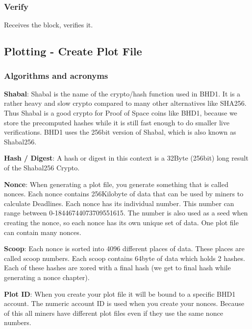 \subsubsection{Verify}
\begin{flushleft}
    Receives the block, verifies it.
\end{flushleft}
\subsection{Plotting - Create Plot File}
\subsubsection{Algorithms and acronyms}
\begin{flushleft}
    \textbf{Shabal}: Shabal is the name of the crypto/hash function used in BHD1. It is a rather heavy and slow crypto compared to many other alternatives like SHA256. Thus Shabal is a good crypto for Proof of Space coins like BHD1, because we store the precomputed hashes while it is still fast enough to do smaller live verifications. BHD1 uses the 256bit version of Shabal, which is also known as Shabal256.
\end{flushleft}
\begin{flushleft}
    \textbf{Hash / Digest}: A hash or digest in this context is a 32Byte (256bit) long result of the Shabal256 Crypto.
\end{flushleft}
\begin{flushleft}
    \textbf{Nonce}: When generating a plot file, you generate something that is called nonces. Each nonce contains 256Kilobyte of data that can be used by miners to calculate Deadlines. Each nonce has its individual number. This number can range between 0-18446744073709551615. The number is also used as a seed when creating the nonce, so each nonce has its own unique set of data. One plot file can contain many nonces.
\end{flushleft}
\begin{flushleft}
    \textbf{Scoop}: Each nonce is sorted into 4096 different places of data. These places are called scoop numbers. Each scoop contains 64byte of data which holds 2 hashes. Each of these hashes are xored with a final hash (we get to final hash while generating a nonce chapter).
\end{flushleft}
\begin{flushleft}
    \textbf{Plot ID}: When you create your plot file it will be bound to a specific BHD1 account. The numeric account ID is used when you create your nonces. Because of this all miners have different plot files even if they use the same nonce numbers.
\end{flushleft}
